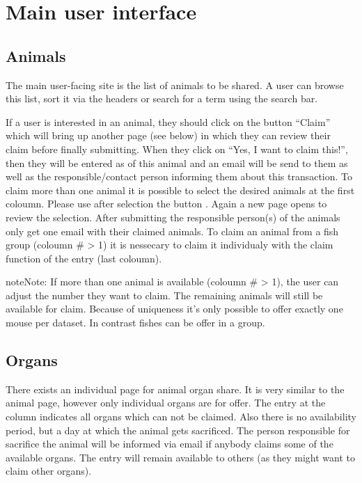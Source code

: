 \documentclass[letterpaper,10pt,openany,oneside,english]{sphinxmanual}
\begin{document}
\chapter{Main user interface}
\label{\detokenize{index:main-user-interface}}

\section{Animals}
\label{\detokenize{index:animals}}
The main user-facing site is the list of animals to be shared. A user can browse this list, sort it
via the headers or search for a term using the search bar.

\noindent{}

If a user is interested in an animal, they should click on the button “Claim” which will bring up
another page (see below) in which they can review their claim before finally submitting. When they
click on “Yes, I want to claim this!”, then they will be entered as  of this animal and
an email will be send to them as well as the responsible/contact person informing them about this
transaction. To claim more than one animal it is possible to select the desired animals at the first coloumn.
Please use after selection the button . Again a new page opens to review the selection.
After submitting the responsible person(s) of the animals only get one email with their claimed animals.
To claim an animal from a fish group (coloumn \# \textgreater{} 1) it is nessecary to claim it individualy with the claim function of
the entry (last coloumn).

\begin{sphinxadmonition}{note}{Note:}
If more than one animal is available (coloumn \# \textgreater{} 1), the user can adjust the number they want to claim.
The remaining animals will still be available for claim. Because of uniqueness it’s only
possible to offer exactly one mouse per dataset. In contrast fishes can be offer in a group.
\end{sphinxadmonition}

\noindent{}


\section{Organs}
\label{\detokenize{index:organs}}
There exists an individual page for animal organ share. It is very similar to the animal page,
however only individual organs are for offer. The entry at the column  indicates
all organs which can not be claimed. Also there is no availability period, but a day at
which the animal gets sacrificed. The person responsible for sacrifice the animal will be informed via
email if anybody claims some of the available organs. The entry will remain available to others (as
they might want to claim other organs).
\end{document}
